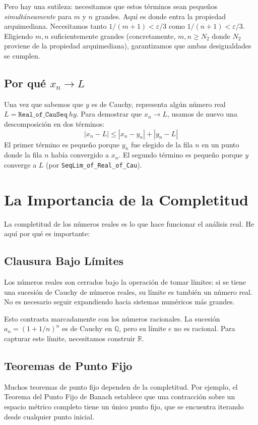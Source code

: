 Pero hay una sutileza: necesitamos que estos términos sean pequeños
\emph{simultáneamente} para $m$ y $n$ grandes. Aquí es donde entra la propiedad
arquimediana. Necesitamos tanto $1/(m+1) < \varepsilon/3$ como
$1/(n+1) < \varepsilon/3$. Eligiendo $m, n$ suficientemente grandes (concretamente,
$m, n \geq N_2$ donde $N_2$ proviene de la propiedad arquimediana), garantizamos
que ambas desigualdades se cumplen.

\subsection{Por qué $x_n \to L$}

Una vez que sabemos que $y$ es de Cauchy, representa algún número real
$L = \texttt{Real\_of\_CauSeq}\ \mathit{hy}$.
Para demostrar que $x_n \to L$, usamos de nuevo una descomposición en dos términos:
\[
  |x_n - L| \leq |x_n - y_n| + |y_n - L|
\]
El primer término es pequeño porque $y_n$ fue elegido de la fila $n$ en un punto
donde la fila $n$ había convergido a $x_n$. El segundo término es pequeño porque
$y$ converge a $L$ (por \texttt{SeqLim\_of\_Real\_of\_Cau}).

\section{La Importancia de la Completitud}

La completitud de los números reales es lo que hace funcionar el análisis real.
He aquí por qué es importante:

\subsection{Clausura Bajo Límites}

Los números reales son cerrados bajo la operación de tomar límites: si se tiene una
sucesión de Cauchy de números reales, su límite es también un número real. No es
necesario seguir expandiendo hacia sistemas numéricos más grandes.

Esto contrasta marcadamente con los números racionales. La sucesión
$a_n = (1 + 1/n)^n$ es de Cauchy en $\mathbb{Q}$, pero su límite $e$ no es
racional. Para capturar este límite, necesitamos construir $\mathbb{R}$.

\subsection{Teoremas de Punto Fijo}

Muchos teoremas de punto fijo dependen de la completitud. Por ejemplo, el Teorema
del Punto Fijo de Banach establece que una contracción sobre un espacio métrico
completo tiene un único punto fijo, que se encuentra iterando desde cualquier punto
inicial.


